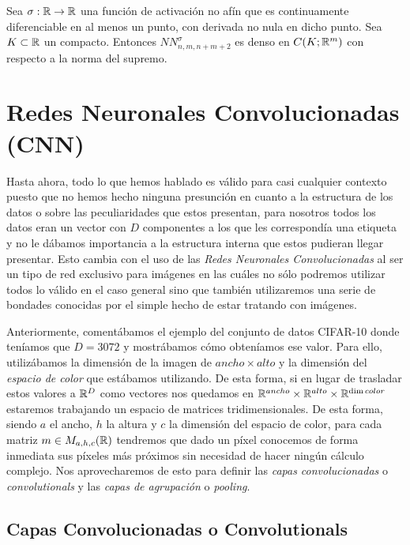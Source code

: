 \begin{teorema}
Sea $\sigma : \mathbb{R} \to \mathbb{R}$ una función de activación no afín que es continuamente diferenciable en al menos un punto, con derivada no nula en dicho punto. Sea $K \subset \mathbb{R}$ un compacto. Entonces $NN_{n,m,n+m+2}^\sigma$ es denso en $C(K;\mathbb{R}^m)$ con respecto a la norma del supremo.
\end{teorema}


\chapter{Redes Neuronales Convolucionadas (CNN)}

Hasta ahora, todo lo que hemos hablado es válido para casi cualquier contexto puesto que no hemos hecho ninguna presunción en cuanto a la estructura de los datos o sobre las peculiaridades que estos presentan, para nosotros todos los datos eran un vector con $D$ componentes a los que les correspondía una etiqueta y no le dábamos importancia a la estructura interna que estos pudieran llegar presentar. Esto cambia con el uso de las \emph{Redes Neuronales Convolucionadas} al ser un tipo de red exclusivo para imágenes en las cuáles no sólo podremos utilizar todos lo válido en el caso general sino que también utilizaremos una serie de bondades conocidas por el simple hecho de estar tratando con imágenes.\newline

Anteriormente, comentábamos el ejemplo del conjunto de datos CIFAR-10 donde teníamos que $D=3072$ y mostrábamos cómo obteníamos ese valor. Para ello, utilizábamos la dimensión de la imagen de $ancho \times alto $ y la dimensión del \emph{espacio de color} que estábamos utilizando. De esta forma, si en lugar de trasladar estos valores a $\mathbb{R}^D$ como vectores nos quedamos en $\mathbb{R}^{ancho}\times \mathbb{R}^{alto} \times \mathbb{R}^{\dim color}$ estaremos trabajando un espacio de matrices tridimensionales. De esta forma, siendo $a$ el ancho, $h$ la altura y $c$ la dimensión del espacio de color, para cada matriz $m \in M_{a, h,c}(\mathbb{R})$ tendremos que dado un píxel conocemos de forma inmediata sus píxeles más próximos sin necesidad de hacer ningún cálculo complejo. Nos aprovecharemos de esto para definir las \emph{capas convolucionadas} o \emph{convolutionals} y las \emph{capas de agrupación} o \emph{pooling}.\newline

\section{Capas Convolucionadas o Convolutionals}

